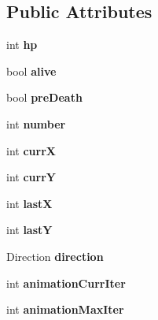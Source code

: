 \subsection*{Public Attributes}
\begin{DoxyCompactItemize}
\item 
\hypertarget{class_creep_a6eb5ff5440246b177151bce91d0fdb1d}{}int {\bfseries hp}\label{class_creep_a6eb5ff5440246b177151bce91d0fdb1d}

\item 
\hypertarget{class_creep_abe798fc76f83bfa05d1cf2d5913bf901}{}bool {\bfseries alive}\label{class_creep_abe798fc76f83bfa05d1cf2d5913bf901}

\item 
\hypertarget{class_creep_ab128a4867457b045867aa56b09d37cc4}{}bool {\bfseries pre\+Death}\label{class_creep_ab128a4867457b045867aa56b09d37cc4}

\item 
\hypertarget{class_creep_aa9998e66d31a755b373fdc679c7b530f}{}int {\bfseries number}\label{class_creep_aa9998e66d31a755b373fdc679c7b530f}

\item 
\hypertarget{class_creep_af52d4a1d3fcdad1d24b6960b6ed2083e}{}int {\bfseries curr\+X}\label{class_creep_af52d4a1d3fcdad1d24b6960b6ed2083e}

\item 
\hypertarget{class_creep_ab4c6c17f0a3e858ed576b9602612caf8}{}int {\bfseries curr\+Y}\label{class_creep_ab4c6c17f0a3e858ed576b9602612caf8}

\item 
\hypertarget{class_creep_aea741509c8bab70139a1be99a7788737}{}int {\bfseries last\+X}\label{class_creep_aea741509c8bab70139a1be99a7788737}

\item 
\hypertarget{class_creep_a1270c1b61e6ed694ce6b38ca0e4453f6}{}int {\bfseries last\+Y}\label{class_creep_a1270c1b61e6ed694ce6b38ca0e4453f6}

\item 
\hypertarget{class_creep_a124185a26ff9e1b4477bbd6d93ca327c}{}Direction {\bfseries direction}\label{class_creep_a124185a26ff9e1b4477bbd6d93ca327c}

\item 
\hypertarget{class_creep_a86ed3b2697a5e511ec2ff31f1b44fd34}{}int {\bfseries animation\+Curr\+Iter}\label{class_creep_a86ed3b2697a5e511ec2ff31f1b44fd34}

\item 
\hypertarget{class_creep_ac4901359fa1a88a50fb13fab0a8586fa}{}int {\bfseries animation\+Max\+Iter}\label{class_creep_ac4901359fa1a88a50fb13fab0a8586fa}


\end{DoxyCompactItemize}
